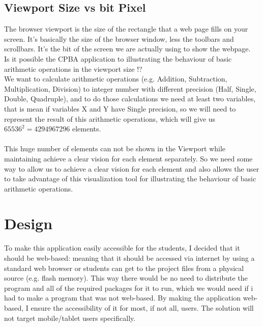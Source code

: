 \documentclass[11pt]{article}
\begin{document}
\subsection{Viewport Size vs bit Pixel}%
The browser viewport is the size of the rectangle that a web page fills on your screen. It’s basically the size of the browser window, less the toolbars and scrollbars. It’s the bit of the screen we are actually using to show the webpage.\\
Is it possible the CPBA application to illustrating the behaviour of basic arithmetic operations in the viewport size !?\\
We want to calculate arithmetic operations (e.g. Addition, Subtraction, Multiplication, Division) to integer number with different precision (Half, Single, Double, Quadruple), and to do those calculations we need at least two variables, that is mean if variables X and Y have Single precision, so we will need to represent the result of this arithmetic operations, which will give us $65536^{2} = 4294967296$ elements.\\\\
This huge number of elements can not be shown in the Viewport while maintaining achieve a clear vision for each element separately. So we need some way to allow us to achieve a clear vision for each element and also allows the user to take advantage of this visualization tool for illustrating the behaviour of basic arithmetic operations.\\
\section{Design}
To make this application easily accessible for the students, I decided that it should be web-based: meaning that it should be accessed via internet by using a standard web browser or students can get to the project files from  a physical source (e.g. flash memory). This way there would be no need to distribute the program and all of the required packages for it to run, which we would need if i had to make a program that was not web-based. By making the application web-based, I ensure the accessibility of it for most, if not all, users.
The solution will not target mobile/tablet users specifically.\\
\end{document}
